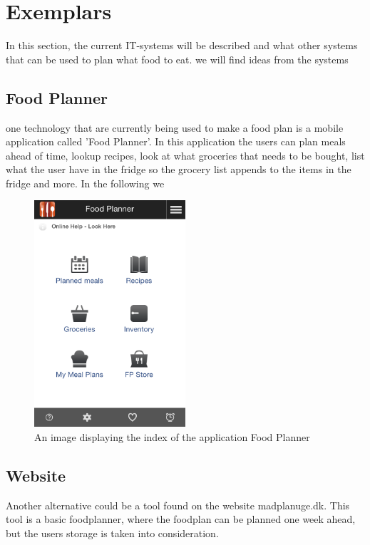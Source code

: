 \section{Exemplars}
In this section, the current IT-systems will be described and what other systems that can be used to plan what food to eat. we will find ideas from the systems

\subsection{Food Planner}
one technology that are currently being used to make a food plan is a mobile application called 'Food Planner'.
In this application the users can plan meals ahead of time, lookup recipes, look at what groceries that needs to be bought,
list what the user have in the fridge so the grocery list appends to the items in the fridge and more. In the following we 

\begin{figure}[H]
    \centering
    \includegraphics[width=0.5\textwidth]{Grafik/FoodPlanner/index}
    \caption{An image displaying the index of the application Food Planner}
    \label{FoodPlannerIndex}
\end{figure}


\subsection{Website}
Another alternative could be a tool found on the website madplanuge.dk\cite{madSpild_madPlanUge}. This tool is a basic foodplanner, where the foodplan can be planned one week ahead, but the users storage is taken into consideration.

